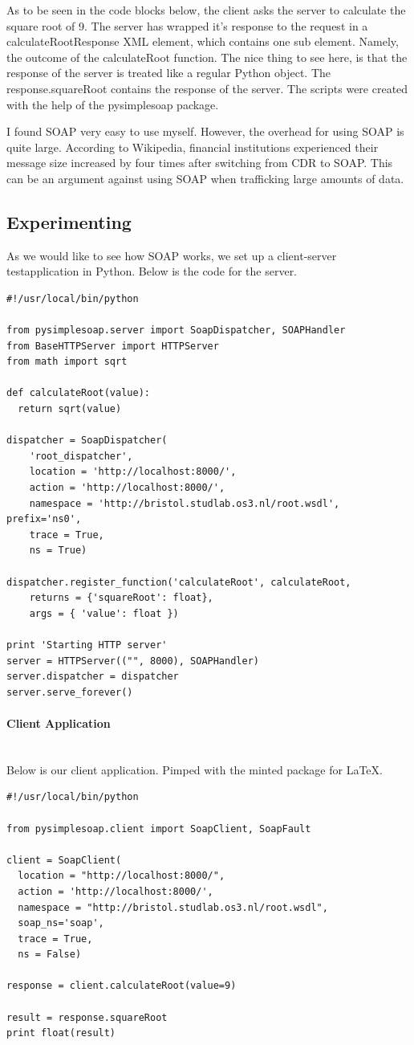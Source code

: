 As to be seen in the code blocks below, the client asks the server to calculate the square root of 9. The server has wrapped it's response to the request in a calculateRootResponse XML element, which contains one sub element. Namely, the outcome of the calculateRoot function. The nice thing to see here, is that the response of the server is treated like a regular Python object. The response.squareRoot contains the response of the server. The scripts were created with the help of the pysimplesoap package.

I found SOAP very easy to use myself. However, the overhead for using SOAP is quite large. According to Wikipedia, financial institutions experienced their message size increased by four times after switching from CDR to SOAP. This can be an argument against using SOAP when trafficking large amounts of data.

\subsection{Experimenting}
As we would like to see how SOAP works, we set up a client-server testapplication in Python. Below is the code for the server.

\begin{verbatim}
#!/usr/local/bin/python
 
from pysimplesoap.server import SoapDispatcher, SOAPHandler
from BaseHTTPServer import HTTPServer
from math import sqrt
 
def calculateRoot(value):
  return sqrt(value)
 
dispatcher = SoapDispatcher(
    'root_dispatcher',
    location = 'http://localhost:8000/',
    action = 'http://localhost:8000/',
    namespace = 'http://bristol.studlab.os3.nl/root.wsdl', prefix='ns0',
    trace = True,
    ns = True)
 
dispatcher.register_function('calculateRoot', calculateRoot,
    returns = {'squareRoot': float},
    args = { 'value': float })
 
print 'Starting HTTP server'
server = HTTPServer(("", 8000), SOAPHandler)
server.dispatcher = dispatcher
server.serve_forever()
\end{verbatim}

\paragraph{Client Application}\mbox{}\\
Below is our client application. Pimped with the minted package for \LaTeX.

\begin{verbatim}
#!/usr/local/bin/python
 
from pysimplesoap.client import SoapClient, SoapFault
 
client = SoapClient(
  location = "http://localhost:8000/",
  action = 'http://localhost:8000/',
  namespace = "http://bristol.studlab.os3.nl/root.wsdl", 
  soap_ns='soap',
  trace = True,
  ns = False)
 
response = client.calculateRoot(value=9)
 
result = response.squareRoot
print float(result)
\end{verbatim}
